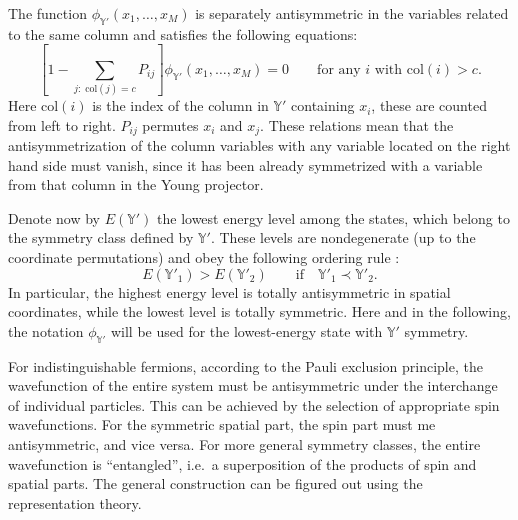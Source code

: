 \documentclass[pdftex]{sigma}
\newcommand{\yn}{\mathbb{Y}}
\begin{document}
The function $\phi_{\yn'}(x_1,\dots,x_M)$ is separately antisymmetric in the variables
related to the same column and satisf\/ies the following equations:
\begin{equation}
\label{sym-cond}
\left[1-\sum_{j:\;\text{col}(j)=c }P_{ij} \right] \phi_{\yn'}(x_1,\dots,x_M)=0
 \qquad
 \text{for any $i$ with $\text{col}(i)>c$}.
\end{equation}
Here  $\text{col}(i)$ is the index of the column in $\yn'$ containing $x_i$, these are counted
from left to right. $P_{ij}$ permutes $x_i$ and $x_j$.
These relations mean that the antisymmetrization of the column variables with any variable
located on the right hand side must vanish, since it
has been  already symmetrized with a variable from that column in the
Young projector.

Denote now by $E(\yn')$ the lowest energy level among the  states, which belong to the
symmetry class def\/ined by $\yn'$.  These levels are nondegenerate (up to the coordinate
permutations) and obey the following
ordering rule \cite{LM62'}:
\begin{equation}
\label{lm'}
E(\yn'_1)>E(\yn'_2) \qquad \text{if}\quad \yn'_1\prec \yn'_2.
\end{equation}
 In particular, the highest energy level
is totally antisymmetric in spatial coordinates,  while the lowest level is
totally  symmetric. Here and in the following, the notation $\phi_{\yn'}$  will
be used  for the lowest-energy state with  $\yn'$ symmetry.

For indistinguishable fermions, according to the Pauli exclusion principle, the
wavefunction of the entire system must be antisymmetric under the interchange of
individual particles. This can be achieved by the selection of appropriate
spin wavefunctions. For the  symmetric spatial part, the spin part must
me antisymmetric, and vice versa. For more general symmetry classes,
the entire wavefunction is ``entangled'', i.e.\ a superposition
of the products of spin and spatial parts. The general construction
can be f\/igured out using the representation theory.
\end{document}
